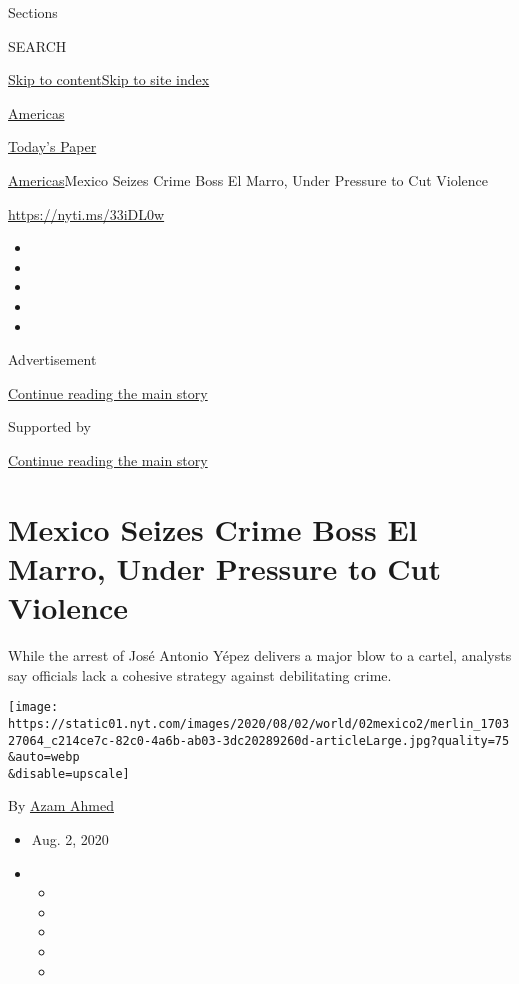 Sections

SEARCH

\protect\hyperlink{site-content}{Skip to
content}\protect\hyperlink{site-index}{Skip to site index}

\href{https://www.nytimes.com/section/world/americas}{Americas}

\href{https://myaccount.nytimes.com/auth/login?response_type=cookie\&client_id=vi}{}

\href{https://www.nytimes.com/section/todayspaper}{Today's Paper}

\href{/section/world/americas}{Americas}\textbar{}Mexico Seizes Crime
Boss El Marro, Under Pressure to Cut Violence

\url{https://nyti.ms/33iDL0w}

\begin{itemize}
\item
\item
\item
\item
\item
\end{itemize}

Advertisement

\protect\hyperlink{after-top}{Continue reading the main story}

Supported by

\protect\hyperlink{after-sponsor}{Continue reading the main story}

\hypertarget{mexico-seizes-crime-boss-el-marro-under-pressure-to-cut-violence}{%
\section{Mexico Seizes Crime Boss El Marro, Under Pressure to Cut
Violence}\label{mexico-seizes-crime-boss-el-marro-under-pressure-to-cut-violence}}

While the arrest of José Antonio Yépez delivers a major blow to a
cartel, analysts say officials lack a cohesive strategy against
debilitating crime.

\texttt{[image: https://static01.nyt.com/images/2020/08/02/world/02mexico2/merlin\_170327064\_c214ce7c-82c0-4a6b-ab03-3dc20289260d-articleLarge.jpg?quality=75\\\&auto=webp\\\&disable=upscale]}

By \href{https://www.nytimes.com/by/azam-ahmed}{Azam Ahmed}

\begin{itemize}
\item
  Aug. 2, 2020
\item
  \begin{itemize}
  \item
  \item
  \item
  \item
  \item
  \end{itemize}
\end{itemize}

